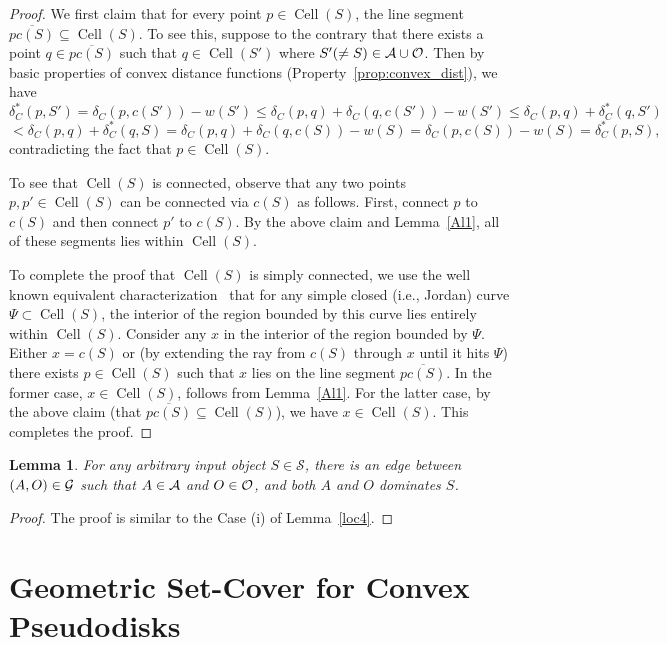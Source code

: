 \documentclass[a4paper,11pt]{article}
\DeclareMathOperator{\Cell}{Cell}
\newtheorem{lemma}{Lemma}
\begin{document}
\begin{proof}
We first claim that for every point $p  \in \Cell(S)$, the line segment $\overline{pc(S)} \subseteq \Cell(S)$. To see this, suppose to the contrary that there exists a point $q \in\overline{pc(S)}$  such that $q\in \Cell(S')$ where $S'(\neq S)\in {\cal A}\cup {\cal O}$. Then by basic
properties of convex distance functions (Property~\ref{prop:convex_dist}), we have
\[\delta_C^{*}(p, S')= \delta_C(p,c(S'))-w(S') \leq \delta_C(p,q)+ \delta_C(q,c(S'))-w(S')
\leq \delta_C(p,q) + \delta_C^{*}(q, S')\] \[ < \delta_C(p,q) + \delta_C^{*}(q, S) =\delta_C(p,q) + \delta_C(q,c(S))-w(S)= \delta_C(p,c(S))-w(S)= \delta_C^{*}(p, S),\] contradicting the fact that $p\in \Cell(S)$. 



To see that $\Cell(S)$ is connected, observe that any two points $p, p' \in \Cell(S)$ can be connected via  $c(S)$ as follows. 
First, connect $p$ to $c(S)$  and then connect $p'$ to $c(S)$. 
 By the above claim and Lemma~\ref{Al1}, all of these segments lies within $\Cell(S)$.

To complete the proof that $\Cell(S)$ is simply connected, we use the well known equivalent characterization~\cite{KleinW88} that for any simple closed (i.e., Jordan) curve $\Psi \subset \Cell(S)$, the interior of the region bounded by this curve lies entirely within $\Cell(S)$. 
Consider any $x$ in the interior of the region bounded by $\Psi$. 
Either $x= c(S)$ or (by extending the ray from $c(S)$ through $x$ until it hits $\Psi$) there exists $p \in \Cell(S)$ such that $x$ lies on the line segment $\overline{pc(S)}$. In the former case, $x\in \Cell(S)$, follows from Lemma~\ref{Al1}. For the latter case, by the above claim (that $\overline{pc(S)} \subseteq \Cell(S)$), we have  $x\in \Cell(S)$. This completes the proof.
\end{proof}


\begin{lemma}\label{Aloc4}
  For any arbitrary input object $S  \in  \mathscr{S}$, there is an edge 
between 
$(A,O)\in {\cal G}$ such that $A\in {\cal A}$ and $O\in {\cal O}$, and both 
$A$ and $O$ dominates $S$. 
 \end{lemma}
 \begin{proof}
The proof is similar to the Case (i) of Lemma~\ref{loc4}.
\end{proof}




 \section{Geometric Set-Cover for Convex Pseudodisks}\label{setCover}
 
\end{document}
